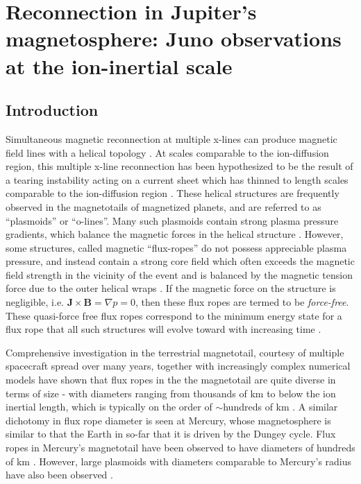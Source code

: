 \chapter{Reconnection in Jupiter's magnetosphere: Juno observations at the ion-inertial scale}

\section{Introduction}

Simultaneous magnetic reconnection at multiple x-lines can produce magnetic field lines with a helical topology \cite{Hones1984StructureActivity, Slavin2003GeotailSheet}. At scales comparable to the ion-diffusion region, this multiple x-line reconnection has been hypothesized to be the result of a tearing instability acting on a current sheet which has thinned to length scales comparable to the ion-diffusion region \cite{Drake2006ElectronReconnection, Daughton2011RolePlasmas, Lapenta2015SecondaryFronts}. These helical structures are frequently observed in the magnetotails of magnetized planets, and are referred to as ``plasmoids'' or ``o-lines''. Many such plasmoids contain strong plasma pressure gradients, which balance the magnetic forces in the helical structure \cite{Hones1984StructureActivity, Slavin1989CDAWAssessment, Kivelson1995ModelsPlasmas}. However, some structures, called magnetic ``flux-ropes'' do not possess appreciable plasma pressure, and instead contain a strong core field \cite{Sibeck1984MagnetotailRopes, Moldwin1991PlasmoidsRopes} which often exceeds the magnetic field strength in the vicinity of the event and is balanced by the magnetic tension force due to the outer helical wraps \cite{Kivelson1995ModelsPlasmas, Slavin1995ISEETopologies}. If the magnetic force on the structure is negligible, i.e. $\mathbf{J}\times\mathbf{B} = \nabla p = 0$, then these flux ropes are termed to be \emph{force-free}. These quasi-force free flux ropes correspond to the minimum energy state for a flux rope that all such structures will evolve toward with increasing time \cite{Taylor1974RelaxationFields, Priest2013TheLecture}.

Comprehensive investigation in the terrestrial magnetotail, courtesy of multiple spacecraft spread over many years, together with increasingly complex numerical models \cite{Drake2006ElectronReconnection, Drake2006FormationReconnection} have shown that flux ropes in the the magnetotail are quite diverse in terms of size - with diameters ranging from thousands of km to below the ion inertial length, which is typically on the order of $\sim$hundreds of km \cite{Eastwood2016Ion-scaleMMS, Sun2019MMSSheet}. A similar dichotomy in flux rope diameter is seen at Mercury, whose magnetosphere is similar to that the Earth in so-far that it is driven by the Dungey cycle. Flux ropes in Mercury's magnetotail have been observed to have diameters of hundreds of km \cite{DiBraccio2015MESSENGERMagnetotail, Slavin2009MESSENGERMagnetosphere}. However, large plasmoids with diameters comparable to Mercury's radius have also been observed \cite{Zhong2019Magnetotail}.

